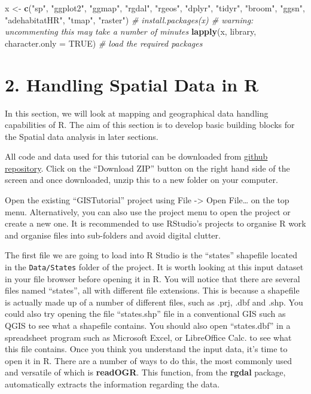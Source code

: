 \documentclass[]{article}
\newenvironment{Shaded}{}{}
\newcommand{\CommentTok}[1]{\textcolor[rgb]{0.38,0.63,0.69}{\textit{#1}}}
\newcommand{\DataTypeTok}[1]{\textcolor[rgb]{0.56,0.13,0.00}{#1}}
\newcommand{\KeywordTok}[1]{\textcolor[rgb]{0.00,0.44,0.13}{\textbf{#1}}}
\newcommand{\NormalTok}[1]{#1}
\newcommand{\OtherTok}[1]{\textcolor[rgb]{0.00,0.44,0.13}{#1}}
\newcommand{\StringTok}[1]{\textcolor[rgb]{0.25,0.44,0.63}{#1}}
\begin{document}
\begin{Shaded}
\begin{Highlighting}[]
\NormalTok{x <-}\StringTok{ }\KeywordTok{c}\NormalTok{(}\StringTok{"sp"}\NormalTok{, }\StringTok{"ggplot2"}\NormalTok{, }\StringTok{"ggmap"}\NormalTok{, }\StringTok{"rgdal"}\NormalTok{, }\StringTok{"rgeos"}\NormalTok{, }\StringTok{"dplyr"}\NormalTok{, }\StringTok{"tidyr"}\NormalTok{, }\StringTok{"broom"}\NormalTok{, }\StringTok{"ggsn"}\NormalTok{, }\StringTok{"adehabitatHR"}\NormalTok{, }\StringTok{"tmap"}\NormalTok{, }\StringTok{"raster"}\NormalTok{) }
\CommentTok{# install.packages(x) # warning: uncommenting this may take a number of minutes}
\KeywordTok{lapply}\NormalTok{(x, library, }\DataTypeTok{character.only =} \OtherTok{TRUE}\NormalTok{) }\CommentTok{# load the required packages}
\end{Highlighting}
\end{Shaded}

\hypertarget{handling-spatial-data-in-r}{%
\section{2. Handling Spatial Data in
R}\label{handling-spatial-data-in-r}}

In this section, we will look at mapping and geographical data handling
capabilities of R. The aim of this section is to develop basic building
blocks for the Spatial data analysis in later sections.

All code and data used for this tutorial can be downloaded from
\href{https://github.com/rajwanimayur/SpatialAnalysisInR}{github
repository}. Click on the ``Download ZIP'' button on the right hand side
of the screen and once downloaded, unzip this to a new folder on your
computer.

Open the existing ``GISTutorial'' project using File -\textgreater{}
Open File\ldots{} on the top menu. Alternatively, you can also use the
project menu to open the project or create a new one. It is recommended
to use RStudio's projects to organise R work and organise files into
sub-folders and avoid digital clutter.

The ﬁrst ﬁle we are going to load into R Studio is the ``states''
shapeﬁle located in the \texttt{Data/States} folder of the project. It
is worth looking at this input dataset in your ﬁle browser before
opening it in R. You will notice that there are several ﬁles named
``states'', all with different ﬁle extensions. This is because a
shapeﬁle is actually made up of a number of different ﬁles, such as
.prj, .dbf and .shp. You could also try opening the ﬁle ``states.shp''
ﬁle in a conventional GIS such as QGIS to see what a shapeﬁle contains.
You should also open ``states.dbf'' in a spreadsheet program such as
Microsoft Excel, or LibreOffice Calc. to see what this ﬁle contains.
Once you think you understand the input data, it's time to open it in R.
There are a number of ways to do this, the most commonly used and
versatile of which is \textbf{readOGR}. This function, from the
\textbf{rgdal} package, automatically extracts the information regarding
the data.
\end{document}
